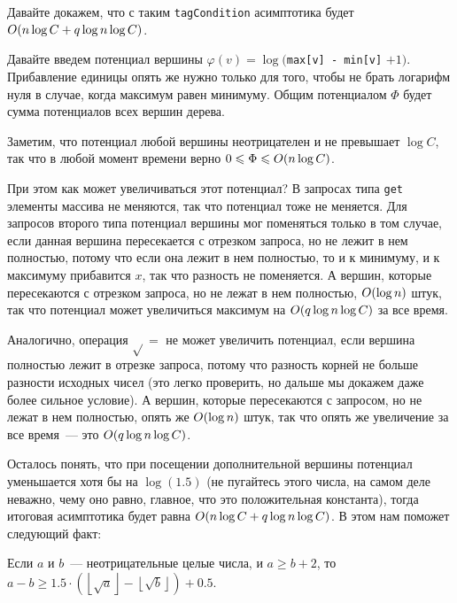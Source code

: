 Давайте докажем, что с таким \verb+tagCondition+ асимптотика будет $O(n \log C + q \log n \log C)$.

Давайте введем потенциал вершины $\varphi(v) = \log($\verb+max[v] - min[v]+ $+ 1)$. Прибавление единицы опять же нужно только для того, чтобы не брать логарифм нуля в случае, когда максимум равен минимуму.
Общим потенциалом $\Phi$ будет сумма потенциалов всех вершин дерева.

Заметим, что потенциал любой вершины неотрицателен и не превышает $\log C$, так что в любой момент времени верно $0 \leqslant \Phi \leqslant O(n \log C)$.

При этом как может увеличиваться этот потенциал? В запросах типа \verb+get+ элементы массива не меняются, так что потенциал тоже не меняется. Для запросов второго типа потенциал вершины мог поменяться только в том случае, если данная вершина пересекается с отрезком запроса, но не лежит в нем полностью, потому что если она лежит в нем полностью, то и к минимуму, и к максимуму прибавится $x$, так что разность не поменяется. А вершин, которые пересекаются с отрезком запроса, но не лежат в нем полностью, $O(\log n)$ штук, так что потенциал может увеличиться максимум на $O(q \log n \log C)$ за все время.

Аналогично, операция $\sqrt{}=$ не может увеличить потенциал, если вершина полностью лежит в отрезке запроса, потому что разность корней не больше разности исходных чисел (это легко проверить, но дальше мы докажем даже более сильное условие). А вершин, которые пересекаются с запросом, но не лежат в нем полностью, опять же $O(\log n)$ штук, так что опять же увеличение за все время~--- это $O(q \log n \log C)$.

Осталось понять, что при посещении дополнительной вершины потенциал уменьшается хотя бы на $\log (1.5)$ (не пугайтесь этого числа, на самом деле неважно, чему оно равно, главное, что это положительная константа), тогда итоговая асимптотика будет равна $O(n \log C + q \log n \log C)$. В этом нам поможет следующий факт:

\begin{theorem}
    Если $a$ и $b$~--- неотрицательные целые числа, и $a \ge b + 2$, то $a - b \ge 1.5 \cdot \left( \left\lfloor \sqrt{a} \right\rfloor - \left\lfloor \sqrt{b} \right\rfloor \right) + 0.5$.
\end{theorem}

